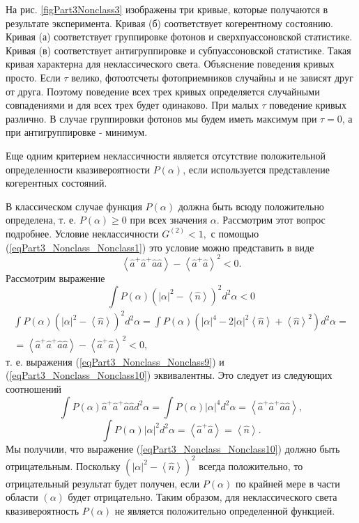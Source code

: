 

На рис. \ref{figPart3Nonclass3} изображены три кривые, которые
получаются в результате эксперимента. Кривая (б) соответствует
когерентному состоянию. Кривая (а) соответствует группировке фотонов и
сверхпуассоновской статистике. Кривая (в) соответствует
антигруппировке и субпуассоновской статистике. Такая кривая характерна
для неклассического света. Объяснение поведения кривых просто. Если
$\tau$ велико, фотоотсчеты фотоприемников случайны и не зависят друг
от друга. Поэтому поведение всех трех кривых определяется случайными
совпадениями и для всех трех будет одинаково. При малых $\tau$
поведение кривых различно. В случае группировки фотонов мы будем иметь
максимум при $\tau = 0$, а при антигруппировке - минимум.

Еще одним критерием неклассичности является отсутствие положительной
определенности квазивероятности $P\left(\alpha\right)$, если
используется представление когерентных состояний.

В классическом случае функция $P\left(\alpha\right)$ должна быть всюду
положительно определена, т. е. $P\left(\alpha\right) \ge 0$ при всех
значения $\alpha$. Рассмотрим этот вопрос подробнее. Условие
неклассичности 
\(
G^{(2)} < 1, 
\)
с помощью (\ref{eqPart3_Nonclass_Nonclass1}) это условие
можно представить в виде
\begin{equation}
\left<\hat{a}^{+}\hat{a}^{+}\hat{a}\hat{a}\right> -
\left<\hat{a}^{+}\hat{a}\right>^2 < 0.
\label{eqPart3_Nonclass_Nonclass9}
\end{equation}
Рассмотрим выражение
\begin{equation}
\int P\left(\alpha\right)\left(\left|\alpha\right|^2 -
\left<\hat{n}\right>\right)^2 d^2\alpha < 0
\label{eqPart3_Nonclass_Nonclass10}
\end{equation}
\begin{eqnarray}
\int P\left(\alpha\right)\left(\left|\alpha\right|^2 -
\left<\hat{n}\right>\right)^2 d^2\alpha = 
\int P\left(\alpha\right)\left(\left|\alpha\right|^4 -
2\left|\alpha\right|^2 \left<\hat{n}\right> +
\left<\hat{n}\right>^2\right) d^2\alpha = 
\nonumber \\
=
\left<\hat{a}^{+}\hat{a}^{+}\hat{a}\hat{a}\right> -
\left<\hat{a}^{+}\hat{a}\right>^2 < 0,
\nonumber
\end{eqnarray}
т. е. выражения (\ref{eqPart3_Nonclass_Nonclass9}) и
(\ref{eqPart3_Nonclass_Nonclass10}) эквивалентны. Это следует из
следующих соотношений
\[
\int P\left(\alpha\right)\hat{a}^{+}\hat{a}^{+}\hat{a}\hat{a} d^2
\alpha = 
\int P\left(\alpha\right)\left|\alpha\right|^4 d^2\alpha = 
\left<\hat{a}^{+}\hat{a}^{+}\hat{a}\hat{a}\right>,
\]
\[
\int P\left(\alpha\right)\left|\alpha\right|^2 d^2\alpha = 
\left<\hat{a}^{+}\hat{a}\right> = \left<\hat{n}\right>.
\]
Мы получили, что выражение (\ref{eqPart3_Nonclass_Nonclass10}) должно
быть отрицательным. Поскольку 
\(
\left(\left|\alpha\right|^2 -
\left<\hat{n}\right>\right)^2
\)
всегда положительно, то отрицательный результат будет получен, если 
$P\left(\alpha\right)$ по крайней мере в части области $(\alpha)$
будет отрицательно. Таким образом, для неклассического света
квазивероятность $P\left(\alpha\right)$ не является положительно
определенной функцией.

